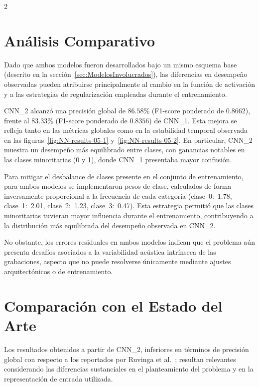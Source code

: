 \documentclass[12pt]{report}
\newenvironment{tightmulticols}{%
  \begin{multicols}{2}
  \setlength{\parskip}{1.2pt}
  \linespread{1}\selectfont
}{%
  \end{multicols}
}
\begin{document}
\begin{tightmulticols}

\section{Análisis Comparativo}

\noindent Dado que ambos modelos fueron desarrollados bajo un mismo esquema base (descrito en la sección~\ref{sec:ModelosInvolucrados}), las diferencias en desempeño observadas pueden atribuirse principalmente al cambio en la función de activación y a las estrategias de regularización empleadas durante el entrenamiento.

\par CNN\_2 alcanzó una precisión global de $86.58\%$ (F1-score ponderado de $0.8662$), frente al $83.33\%$ (F1-score ponderado de $0.8356$) de CNN\_1. Esta mejora se refleja tanto en las métricas globales como en la estabilidad temporal observada en las figuras~\ref{fig:NN-results-05-1} y~\ref{fig:NN-results-05-2}. En particular, CNN\_2 muestra un desempeño más equilibrado entre clases, con ganancias notables en las clases minoritarias (0 y 1), donde CNN\_1 presentaba mayor confusión.

\par Para mitigar el desbalance de clases presente en el conjunto de entrenamiento, para ambos modelos se implementaron pesos de clase, calculados de forma inversamente proporcional a la frecuencia de cada categoría (clase~0:~1.78, clase~1:~2.01, clase~2:~1.23, clase~3:~0.47). Esta estrategia permitió que las clases minoritarias tuvieran mayor influencia durante el entrenamiento, contribuyendo a la distribución más equilibrada del desempeño observada en CNN\_2.

\par No obstante, los errores residuales en ambos modelos indican que el problema aún presenta desafíos asociados a la variabilidad acústica intrínseca de las grabaciones, aspecto que no puede resolverse únicamente mediante ajustes arquitectónicos o de entrenamiento.

\section{Comparación con el Estado del Arte}

\noindent Los resultados obtenidos a partir de CNN\_2, inferiores en términos de precisión global con respecto a los reportados por Ruvinga et al.~\cite{ruvinga2021, ruvinga2023}; resultan relevantes considerando las diferencias sustanciales en el planteamiento del problema y en la representación de entrada utilizada.


\end{tightmulticols}
\end{document}
